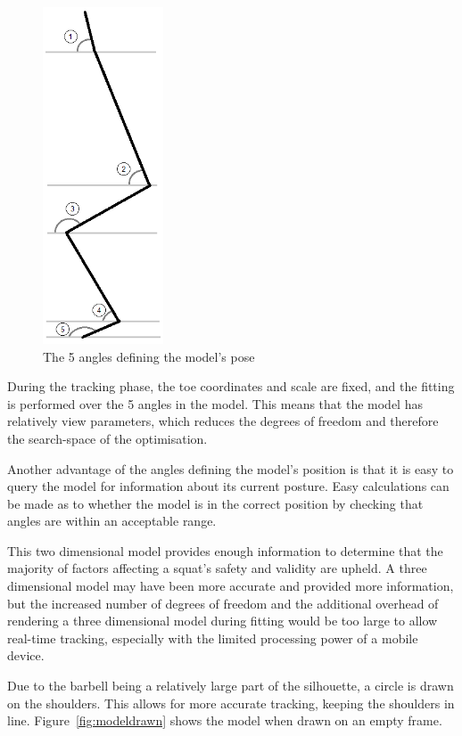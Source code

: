 \begin{figure}[H]
    \centering
	\includegraphics[height=10cm]{algorithm/images/model_angles}
\caption{The 5 angles defining the model's pose}
\label{fig:modelangles}
\end{figure}

During the tracking phase, the toe coordinates and scale are fixed, and the fitting is performed over the 5 angles in the model. This means that the model has relatively view parameters, which reduces the degrees of freedom and therefore the search-space of the optimisation.

Another advantage of the angles defining the model's position is that it is easy to query the model for information about its current posture. Easy calculations can be made as to whether the model is in the correct position by checking that angles are within an acceptable range.

This two dimensional model provides enough information to determine that the majority of factors affecting a squat's safety and validity are upheld. A three dimensional model may have been more accurate and provided more information, but the increased number of degrees of freedom and the additional overhead of rendering a three dimensional model during fitting would be too large to allow real-time tracking, especially with the limited processing power of a mobile device.

Due to the barbell being a relatively large part of the silhouette, a circle is drawn on the shoulders. This allows for more accurate tracking, keeping the shoulders in line. Figure~\ref{fig:modeldrawn} shows the model when drawn on an empty frame.

